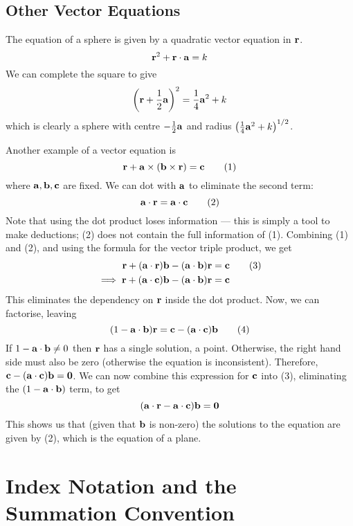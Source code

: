 \documentclass{article}
\begin{document}
\subsection{Other Vector Equations}
The equation of a sphere is given by a quadratic vector equation in $\vb r$.
\[ \vb r^2 + \vb r \cdot \vb a = k \]
We can complete the square to give
\[ \left(\vb r + \frac 1 2 \vb a \right)^2 = \frac 1 4 \vb a^2 + k \]
which is clearly a sphere with centre $-\frac 1 2 \vb a$ and radius $\left( \frac 1 4 \vb a^2 + k \right)^{1/2}$.

Another example of a vector equation is
\[ \vb r + \vb a \times (\vb b \times \vb r) = \vb c \tag{1} \]
where $\vb a, \vb b, \vb c$ are fixed. We can dot with $\vb a$ to eliminate the second term:
\[ \vb a \cdot \vb r = \vb a \cdot \vb c \tag{2} \]
Note that using the dot product loses information --- this is simply a tool to make deductions; (2) does not contain the full information of (1). Combining (1) and (2), and using the formula for the vector triple product, we get
\begin{align*}
	\vb r + (\vb a \cdot \vb r) \vb b - (\vb a \cdot \vb b) \vb r          & = \vb c \tag{3} \\
	\implies \vb r + (\vb a \cdot \vb c) \vb b - (\vb a \cdot \vb b) \vb r & = \vb c
\end{align*}
This eliminates the dependency on $\vb r$ inside the dot product. Now, we can factorise, leaving
\[ (1 - \vb a \cdot \vb b) \vb r = \vb c - (\vb a \cdot \vb c) \vb b \tag{4} \]
If $1 - \vb a \cdot \vb b \neq 0$ then $\vb r$ has a single solution, a point. Otherwise, the right hand side must also be zero (otherwise the equation is inconsistent). Therefore, $\vb c - (\vb a \cdot \vb c)\vb b = \vb 0$. We can now combine this expression for $\vb c$ into (3), eliminating the $(1- \vb a \cdot \vb b)$ term, to get
\[ (\vb a \cdot \vb r - \vb a \cdot \vb c) \vb b = \vb 0 \]
This shows us that (given that $\vb b$ is non-zero) the solutions to the equation are given by (2), which is the equation of a plane.

\section{Index Notation and the Summation Convention}
\end{document}

